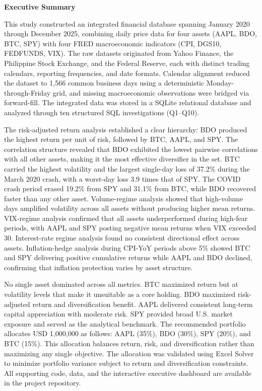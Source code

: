 \newpage

\begin{center}
\textbf{\Large Executive Summary}
\end{center}

This study constructed an integrated financial database spanning January 2020 through December 2025, combining daily price data for four assets (AAPL, BDO, BTC, SPY) with four FRED macroeconomic indicators (CPI, DGS10, FEDFUNDS, VIX). The raw datasets originated from Yahoo Finance, the Philippine Stock Exchange, and the Federal Reserve, each with distinct trading calendars, reporting frequencies, and date formats. Calendar alignment reduced the dataset to 1,566 common business days using a deterministic Monday-through-Friday grid, and missing macroeconomic observations were bridged via forward-fill. The integrated data was stored in a SQLite relational database and analyzed through ten structured SQL investigations (Q1--Q10).

The risk-adjusted return analysis established a clear hierarchy: BDO produced the highest return per unit of risk, followed by BTC, AAPL, and SPY. The correlation structure revealed that BDO exhibited the lowest pairwise correlations with all other assets, making it the most effective diversifier in the set. BTC carried the highest volatility and the largest single-day loss of 37.2\% during the March 2020 crash, with a worst-day loss 3.9 times that of SPY. The COVID crash period erased 19.2\% from SPY and 31.1\% from BTC, while BDO recovered faster than any other asset. Volume-regime analysis showed that high-volume days amplified volatility across all assets without producing higher mean returns. VIX-regime analysis confirmed that all assets underperformed during high-fear periods, with AAPL and SPY posting negative mean returns when VIX exceeded 30. Interest-rate regime analysis found no consistent directional effect across assets. Inflation-hedge analysis during CPI-YoY periods above 5\% showed BTC and SPY delivering positive cumulative returns while AAPL and BDO declined, confirming that inflation protection varies by asset structure.

No single asset dominated across all metrics. BTC maximized return but at volatility levels that make it unsuitable as a core holding. BDO maximized risk-adjusted return and diversification benefit. AAPL delivered consistent long-term capital appreciation with moderate risk. SPY provided broad U.S. market exposure and served as the analytical benchmark. The recommended portfolio allocates USD 1,000,000 as follows: AAPL (35\%), BDO (30\%), SPY (20\%), and BTC (15\%). This allocation balances return, risk, and diversification rather than maximizing any single objective. The allocation was validated using Excel Solver to minimize portfolio variance subject to return and diversification constraints. All supporting code, data, and the interactive executive dashboard are available in the project repository.

\newpage
\tableofcontents
\newpage
